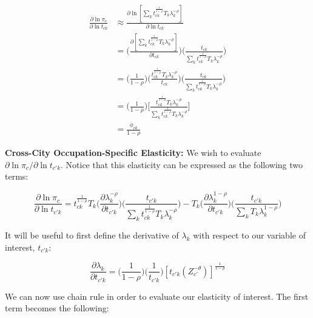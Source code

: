 \documentclass[10pt]{article}
\begin{document}
\begin{align*}
    \frac{\partial\ln{\pi_{c}}}{\partial\ln{t_{ck}}} & \approx \frac{\partial\ln[{\sum\limits_{k}{t^{\frac{1}{1-\rho}}_{ck}}{T_{k}}\lambda_{k}^{-\rho}}]}{\partial\ln{t_{ck}}} \\ &= \Bigg(\frac{\partial[{\sum\limits_{k}{t^{\frac{1}{1-\rho}}_{ck}}{T_{k}}\lambda_{k}^{-\rho}}]}{\partial{t_{ck}}}\Bigg)\Bigg(\frac{t_{ck}}{{\sum\limits_{k}{t^{\frac{1}{1-\rho}}_{ck}}{T_{k}}\lambda_{k}^{-\rho}}}\Bigg)\\ &= \Bigg(\frac{1}{1-\rho}\Bigg)\Bigg(\frac{t_{ck}^{\frac{1}{1-\rho}}{T_{k}}\lambda_{k}^{-\rho}}{t_{ck}}\Bigg)\Bigg(\frac{t_{ck}}{{\sum\limits_{k}{t^{\frac{1}{1-\rho}}_{ck}}{T_{k}}\lambda_{k}^{-\rho}}}\Bigg) \\ &= \Big(\frac{1}{1-\rho}\Big)\Bigg[\frac{{t^{\frac{1}{1-\rho}}_{ck}}{T_{k}}\lambda_{k}^{-\rho}}{\sum\limits_{k}{t^{\frac{1}{1-\rho}}_{ck}}{T_{k}}\lambda_{k}^{-\rho}}\Bigg]\\ &= \frac{\phi_{ck}}{1-\rho}
\end{align*}

\noindent\textbf{Cross-City Occupation-Specific Elasticity:} We wish to evaluate $\partial\ln{\pi_{c}}/\partial\ln{t_{{c'}k}}$. Notice that this elasticity can be expressed as the following two terms:

\begin{equation*}
    \frac{\partial\ln{\pi_{c}}}{\partial\ln{t_{{c'}k}}} = {t^{\frac{1}{1-\rho}}_{ck}}{T_{k}}\Big(\frac{\partial\lambda_{k}^{-\rho}}{\partial{t_{{c'}k}}}\Big)\Big(\frac{t_{{c'}k}}{{\sum\limits_{k}{t^{\frac{1}{1-\rho}}_{ck}}{T_{k}}\lambda_{k}^{-\rho}}}\Big) - {T_{k}}\Big(\frac{\partial\lambda_{k}^{1-\rho}}{\partial{t_{{c'}k}}}\Big)\Big(\frac{t_{{c'}k}}{{\sum\limits_{k}{T_{k}}\lambda_{k}^{1-\rho}}}\Big)
\end{equation*}

It will be useful to first define the derivative of $\lambda_{k}$ with respect to our variable of interest, $t_{{c'}k}$:

\begin{equation*}
    \frac{\partial{\lambda_{k}}}{\partial{t_{{c'}k}}} = \Big(\frac{1}{1-\rho}\Big)\Big(\frac{1}{t_{{c'}k}}\Big)[{t_{{c'}k}}(Z_{c'}^{-\theta})]^{\frac{1}{1-\rho}}
\end{equation*}

We can now use chain rule in order to evaluate our elasticity of interest. The first term becomes the following:
\end{document}
